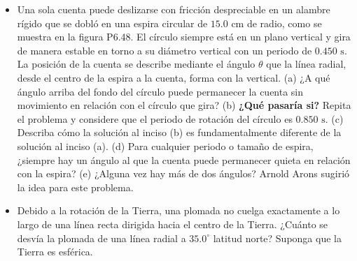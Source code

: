 \documentclass[11pt,a4paper]{article}
\begin{document}
\newpage

\begin{itemize}
    \item[\textbf{48.}] Una sola cuenta puede deslizarse con fricción despreciable en un alambre rígido que se dobló en una espira circular de $15.0 \text{ cm}$ de radio, como se muestra en la figura P6.48. El círculo siempre está en un plano vertical y gira de manera estable en torno a su diámetro vertical con un periodo de $0.450 \text{ s}$. La posición de la cuenta se describe mediante el ángulo $\theta$ que la línea radial, desde el centro de la espira a la cuenta, forma con la vertical. (a) ¿A qué ángulo arriba del fondo del círculo puede permanecer la cuenta sin movimiento en relación con el círculo que gira? (b) \textbf{¿Qué pasaría si?} Repita el problema y considere que el periodo de rotación del círculo es $0.850 \text{ s}$. (c) Describa cómo la solución al inciso (b) es fundamentalmente diferente de la solución al inciso (a). (d) Para cualquier periodo o tamaño de espira, ¿siempre hay un ángulo al que la cuenta puede permanecer quieta en relación con la espira? (e) ¿Alguna vez hay más de dos ángulos? Arnold Arons sugirió la idea para este problema.
    \vspace*{9cm}

    \item[\textbf{49.}] Debido a la rotación de la Tierra, una plomada no cuelga exactamente a lo largo de una línea recta dirigida hacia el centro de la Tierra. ¿Cuánto se desvía la plomada de una línea radial a $35.0^\circ$ latitud norte? Suponga que la Tierra es esférica.
    \vspace*{6cm}


\end{itemize}
\end{document}
